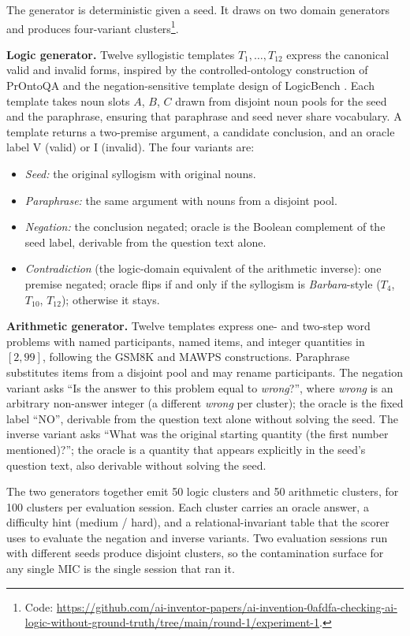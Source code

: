 \documentclass[11pt,letterpaper]{article}
\begin{document}
The generator is deterministic given a seed. It draws on two domain generators and produces four-variant clusters\footnote{Code: \url{https://github.com/ai-inventor-papers/ai-invention-0afdfa-checking-ai-logic-without-ground-truth/tree/main/round-1/experiment-1}.}.

\textbf{Logic generator.} Twelve syllogistic templates $T_1, \ldots, T_{12}$ express the canonical valid and invalid forms, inspired by the controlled-ontology construction of PrOntoQA \citep{Saparov2022} and the negation-sensitive template design of LogicBench \citep{Parmar2024}. Each template takes noun slots $A$, $B$, $C$ drawn from disjoint noun pools for the seed and the paraphrase, ensuring that paraphrase and seed never share vocabulary. A template returns a two-premise argument, a candidate conclusion, and an oracle label V (valid) or I (invalid). The four variants are:
\begin{itemize}
  \item \emph{Seed:} the original syllogism with original nouns.
  \item \emph{Paraphrase:} the same argument with nouns from a disjoint pool.
  \item \emph{Negation:} the conclusion negated; oracle is the Boolean complement of the seed label, derivable from the question text alone.
  \item \emph{Contradiction} (the logic-domain equivalent of the arithmetic inverse): one premise negated; oracle flips if and only if the syllogism is \emph{Barbara}-style ($T_4$, $T_{10}$, $T_{12}$); otherwise it stays.
\end{itemize}

\textbf{Arithmetic generator.} Twelve templates express one- and two-step word problems with named participants, named items, and integer quantities in $[2, 99]$, following the GSM8K \citep{Cobbe2021} and MAWPS \citep{KoncelKedziorski2016} constructions. Paraphrase substitutes items from a disjoint pool and may rename participants. The negation variant asks ``Is the answer to this problem equal to \emph{wrong}?'', where \emph{wrong} is an arbitrary non-answer integer (a different \emph{wrong} per cluster); the oracle is the fixed label ``NO'', derivable from the question text alone without solving the seed. The inverse variant asks ``What was the original starting quantity (the first number mentioned)?''; the oracle is a quantity that appears explicitly in the seed's question text, also derivable without solving the seed.

The two generators together emit 50 logic clusters and 50 arithmetic clusters, for 100 clusters per evaluation session. Each cluster carries an oracle answer, a difficulty hint (medium / hard), and a relational-invariant table that the scorer uses to evaluate the negation and inverse variants. Two evaluation sessions run with different seeds produce disjoint clusters, so the contamination surface for any single MIC is the single session that ran it.
\end{document}
